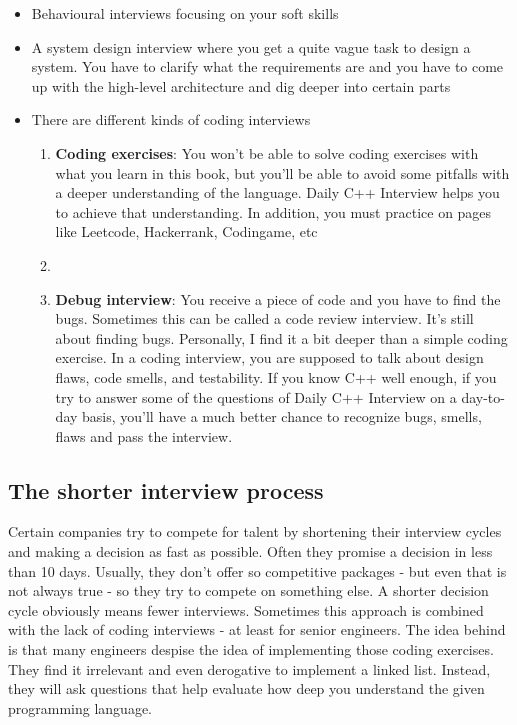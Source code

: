 \documentclass{report}
\begin{document}
\begin{itemize}
    \item Behavioural interviews focusing on your soft skills
    \item A system design interview where you get a quite vague task to design a system. You have to clarify what the requirements are and you have to come up with the high-level architecture and dig deeper into certain parts
    \item There are different kinds of coding interviews
        \begin{enumerate}
            \item \textbf{Coding exercises}: You won’t be able to solve coding exercises with what you learn in this book, but you’ll be able to avoid some pitfalls with a deeper understanding of the language. Daily C++ Interview helps you to achieve that understanding. In addition, you must practice on pages like Leetcode, Hackerrank, Codingame, etc
            \item \item \textbf{Debug interview}: You receive a piece of code and you have to find the bugs. Sometimes this can be called a code review interview. It’s still about finding bugs. Personally, I find it a bit deeper than a simple coding exercise. In a coding interview, you are supposed to talk about design flaws, code smells, and testability. If you know C++ well enough, if you try to answer some of the questions of Daily C++ Interview on a day-to-day basis, you’ll have a much better chance to recognize bugs, smells, flaws and pass the interview.
        \end{enumerate}
\end{itemize}

\bigbreak \noindent 
\subsection{The shorter interview process}
\bigbreak \noindent 
Certain companies try to compete for talent by shortening their interview cycles and making a decision as fast as possible. Often they promise a decision in less than 10 days. Usually, they don’t offer so competitive packages - but even that is not always true - so they try to compete on something else.
\bigbreak \noindent 
A shorter decision cycle obviously means fewer interviews. Sometimes this approach is combined with the lack of coding interviews - at least for senior engineers. The idea behind is that many engineers despise the idea of implementing those coding exercises. They find it irrelevant and even derogative to implement a linked list. Instead, they will ask questions that help evaluate how deep you understand the given programming language.
\end{document}
